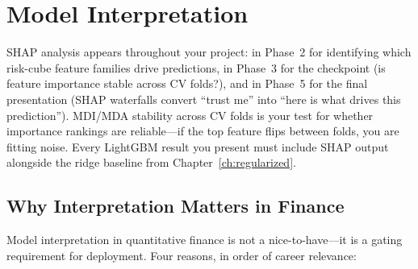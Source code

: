 \chapter{Model Interpretation}
\label{ch:interpretation}

\begin{projectconnection}
SHAP analysis appears throughout your project: in Phase~2 for identifying which risk-cube feature families drive predictions, in Phase~3 for the checkpoint (is feature importance stable across CV folds?), and in Phase~5 for the final presentation (SHAP waterfalls convert ``trust me'' into ``here is what drives this prediction'').
MDI/MDA stability across CV folds is your test for whether importance rankings are reliable---if the top feature flips between folds, you are fitting noise.
Every LightGBM result you present must include SHAP output alongside the ridge baseline from Chapter~\ref{ch:regularized}.
\end{projectconnection}

\section{Why Interpretation Matters in Finance}
\label{sec:why-interpretation}

Model interpretation in quantitative finance is not a nice-to-have---it is a gating requirement for deployment.
Four reasons, in order of career relevance:

